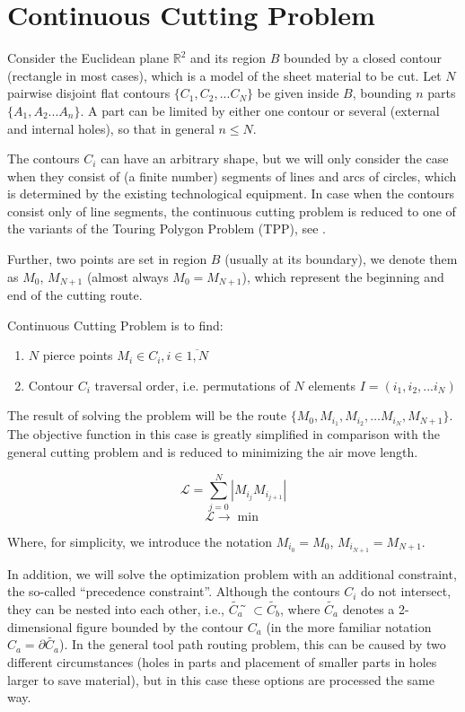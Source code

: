 \documentclass[]{interact}
\theoremstyle{plain}%
\theoremstyle{definition}
\theoremstyle{remark}
\begin{document}
\section{Continuous Cutting Problem}

Consider the Euclidean plane
$\mathbb R ^ 2$
and its region $B$ bounded by a closed contour
(rectangle in most cases),
which is a model of the sheet material to be cut.
Let $N$ pairwise disjoint flat contours
$\{C_1, C_2, ... C_N\}$
be given inside $B$, bounding $n$ parts
$\{A_1, A_2 ... A_n\}$.
A part can be limited by either one contour or several
(external and internal holes),
so that in general
$n \le N$.

The contours
$C_i$
can have an arbitrary shape,
but we will only consider the case
when they consist of (a finite number)
segments of lines and arcs of circles,
which is determined by the existing technological equipment.
In case when the contours consist only of line segments,
the continuous cutting problem
is reduced to one of the variants of the
Touring Polygon Problem (TPP),
see \cite{bi13}.

Further, two points are set in region $B$ (usually at its boundary),
we denote them as
$M_0$, $M_{N + 1}$
(almost always $M_0 = M_{N + 1}$),
which represent the beginning and end of the cutting route.

Continuous Cutting Problem is to find:
\begin{enumerate}
\item $N$ pierce points $M_i \in C_i, i \in \overline{1, N}$
\item Contour $C_i$ traversal order, i.e. permutations of $N$ elements $I = (i_1, i_2, ... i_N)$
\end{enumerate}

The result of solving the problem will be the route
$\{M_0, M_{i_1}, M_{i_2}, \dots M_{i_N}, M_{N + 1}\}$.
The objective function in this case is greatly simplified
in comparison with the general cutting problem
and is reduced to minimizing the air move length.

\begin{equation}
  \mathcal{L} = \sum_{j=0}^N|M_{i_j}M_{i_{j+1}}|
  \label{air-move-length}
\end{equation}
$$
\mathcal{L} \to \min
$$

Where, for simplicity, we introduce the notation
$M_{i_0} = M_0$,
$M_{i_{N + 1}} = M_{N + 1}$.

In addition,
we will solve the optimization problem
with an additional constraint,
the so-called ``precedence constraint''.
Although the contours $C_i$
do not intersect,
they can be nested into each other, i.e.,
$\tilde{C_a} ̃\subset \tilde{C_b}$,
where
$\tilde{C_a}$
denotes a 2-dimensional figure bounded by the contour
$C_a$
(in the more familiar notation
$C_a = \partial \tilde{C_a}$).
In the general tool path routing problem,
this can be caused by two different circumstances
(holes in parts and
placement of smaller parts
in holes larger to save material),
but in this case
these options are processed the same way.
\end{document}
